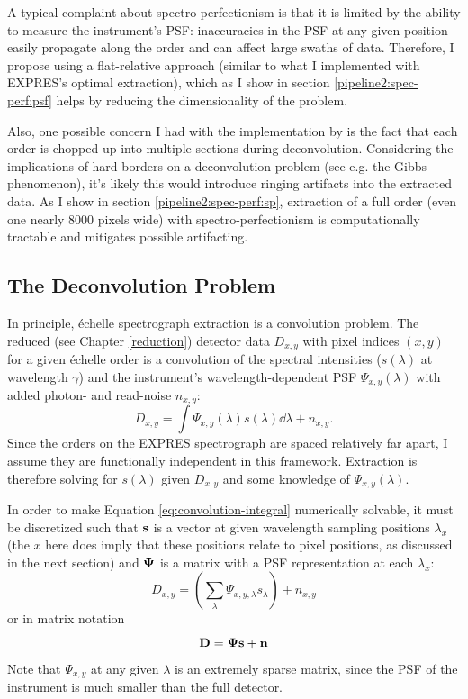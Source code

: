 A typical complaint about spectro-perfectionism is that it is limited by the ability to measure the instrument's PSF: inaccuracies in the PSF at any given position easily propagate along the order and can affect large swaths of data. Therefore, I propose using a flat-relative approach (similar to what I implemented with EXPRES's optimal extraction), which as I show in section \ref{pipeline2:spec-perf:psf} helps by reducing the dimensionality of the problem.

Also, one possible concern I had with the implementation by \citet{cornachione_full_2019} is the fact that each order is chopped up into multiple sections during deconvolution. Considering the implications of hard borders on a deconvolution problem (see e.g. the Gibbs phenomenon), it's likely this would introduce ringing artifacts into the extracted data. As I show in section \ref{pipeline2:spec-perf:sp}, extraction of a full order (even one nearly 8000 pixels wide) with spectro-perfectionism is computationally tractable and mitigates possible artifacting.


\subsection{The Deconvolution Problem} \label{pipeline2:spec-perf:bkgd}

In principle, \'{e}chelle spectrograph extraction is a convolution problem. The reduced (see Chapter \ref{reduction}) detector data $D_{x,y}$ with pixel indices $(x, y)$ for a given \'{e}chelle order is a convolution of the spectral intensities ($s(\lambda)$ at wavelength $\gamma$) and the instrument's wavelength-dependent PSF $\Psi_{x,y}(\lambda)$ with added photon- and read-noise $n_{x,y}$:
\begin{equation}
    D_{x,y} = \int \Psi_{x,y}(\lambda) s(\lambda) \dd{\lambda} + n_{x,y}.
\end{equation}
\label{eq:convolution-integral}
Since the orders on the EXPRES spectrograph are spaced relatively far apart, I assume they are functionally independent in this framework. Extraction is therefore solving for $s(\lambda)$ given $D_{x,y}$ and some knowledge of $\Psi_{x,y}(\lambda)$.

In order to make Equation \ref{eq:convolution-integral} numerically solvable, it must be discretized such that $\vb{s}$ is a vector at given wavelength sampling positions {$\lambda_x$} (the $x$ here does imply that these positions relate to pixel positions, as discussed in the next section) and $\vb{\Psi}$ is a matrix with a PSF representation at each $\lambda_x$:
\begin{equation}
    D_{x,y} = \left( \sum_\lambda \Psi_{x,y,\lambda} s_\lambda \right) + n_{x,y}
    \label{eq:convolution-index}
\end{equation}
or in matrix notation
\begin{equation}
    \vb{D} = \vb{\Psi}\vb{s} + \vb{n}
    \label{eq:convolution-matrix}
\end{equation}
Note that $\Psi_{x,y}$ at any given $\lambda$ is an extremely sparse matrix, since the PSF of the instrument is much smaller than the full detector.

